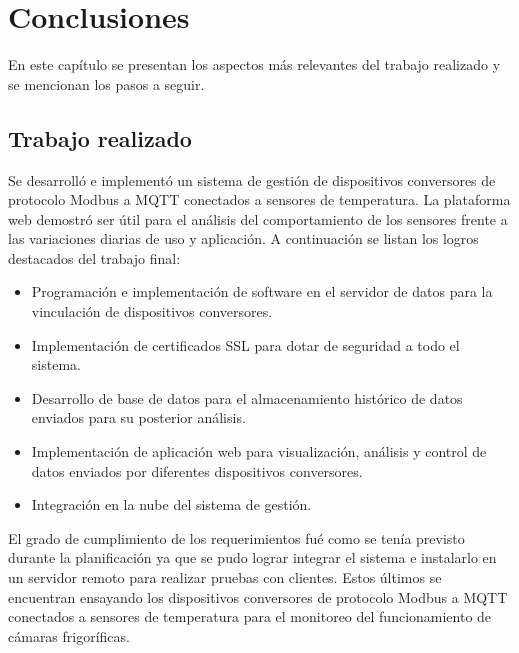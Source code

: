 
\chapter{Conclusiones} %

\label{Chapter5} %

En este capítulo se presentan los aspectos más relevantes del trabajo realizado y
se mencionan los pasos a seguir.



\section{Trabajo realizado}

Se desarrolló e implementó un sistema de gestión de dispositivos conversores de protocolo Modbus a MQTT conectados a sensores de temperatura. La plataforma web demostró ser útil para el análisis del comportamiento de los sensores frente a las variaciones diarias de uso y aplicación.  A continuación se listan los logros destacados del trabajo final:

\begin{itemize}
	\item Programación e implementación de software en el servidor de datos para la vinculación de dispositivos conversores.
	\item Implementación de certificados SSL para dotar de seguridad a todo el sistema.
	\item Desarrollo de base de datos para el almacenamiento histórico de datos enviados para su posterior análisis. 
	\item Implementación de aplicación web para visualización, análisis y control de datos enviados por diferentes dispositivos conversores.
	\item Integración en la nube del sistema de gestión. 
\end{itemize}

El grado de cumplimiento de los requerimientos fué como se tenía previsto durante la planificación ya que se pudo lograr integrar el sistema e instalarlo en un servidor remoto para realizar pruebas con clientes. Estos últimos se encuentran ensayando los dispositivos conversores de protocolo Modbus a MQTT conectados a sensores de temperatura para el monitoreo del funcionamiento de cámaras frigoríficas.

